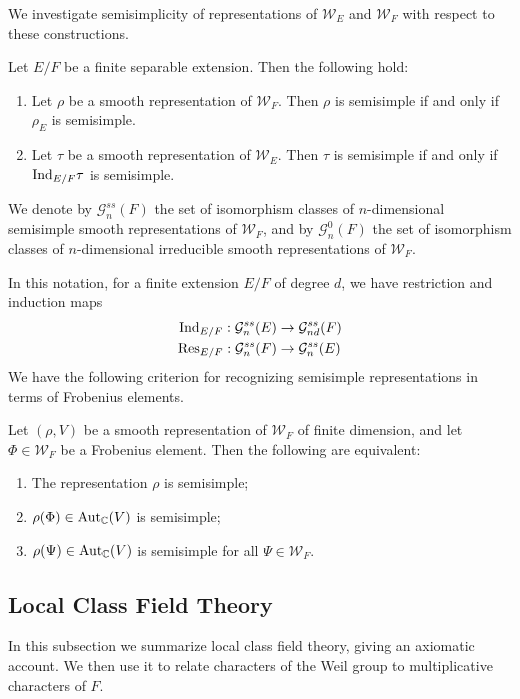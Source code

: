 We investigate semisimplicity of representations of $\mathcal{W}_E$ and $\mathcal{W}_F$ with respect to these constructions.

\begin{lemma}
	Let $E/F$ be a finite separable extension. Then the following hold:
	\begin{enumerate}
		\item Let $\rho$ be a smooth representation of $\mathcal{W}_F$. Then $\rho$ is semisimple if and only if $\rho_E$ is semisimple.
		\item Let $\tau$ be a smooth representation of $\mathcal{W}_E$. Then $\tau$ is semisimple if and only if $\mathrm{Ind}_{E/F} \tau$ is semisimple.
	\end{enumerate}
\end{lemma}
\begin{notn}
	We denote by $\mathcal{G}^{ss}_n(F)$ the set of isomorphism classes of $n$-dimensional semisimple smooth representations of $\mathcal{W}_F$, and by $\mathcal{G}^0_n(F)$ the set of isomorphism classes of $n$-dimensional irreducible smooth representations of $\mathcal{W}_F$.
\end{notn}
In this notation, for a finite extension $E/F$ of degree $d$, we have restriction and induction maps
\begin{align*}
	\mathrm{Ind}_{E/F}: \mathcal{G}^{ss}_n(E) &\to \mathcal{G}^{ss}_{nd}(F)\\
	\mathrm{Res}_{E/F}: \mathcal{G}^{ss}_n(F) &\to \mathcal{G}^{ss}_n(E)
\end{align*}
We have the following criterion for recognizing semisimple representations in terms of Frobenius elements.
\begin{prop}
	Let $(\rho, V)$ be a smooth representation of $\mathcal{W}_F$ of finite dimension, and let $\Phi\in \mathcal{W}_F$ be a Frobenius element. Then the following are equivalent:
	\begin{enumerate}
		\item The representation $\rho$ is semisimple;
		\item $\rho(\Phi)\in \mathrm{Aut}_{\mathbb{C}}(V)$ is semisimple;
		\item $\rho(\Psi)\in \mathrm{Aut}_{\mathbb{C}}(V)$ is semisimple for all $\Psi\in \mathcal{W}_F$.
	\end{enumerate}
\end{prop}
\subsection{Local Class Field Theory}\label{sec:CFT}
In this subsection we summarize local class field theory, giving an axiomatic account. We then use it to relate characters of the Weil group to multiplicative characters of $F$.


